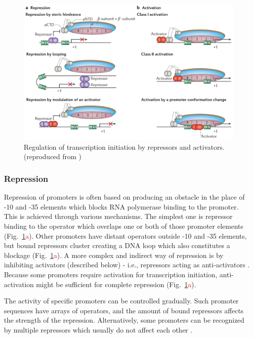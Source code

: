 \begin{figure}[ht!]
  \centering
  \includegraphics[scale=0.4]{text/Pictures/TxnInitRegulation.png}
    \caption{Regulation of transcription initiation by repressors and activators. (reproduced from \cite{browning2016local})}
    \label{txn}
\end{figure}

\subsubsection{Repression}
Repression of promoters is often based on producing an obstacle in the place of -10 and -35 elements which blocks RNA polymerase binding to the promoter.
This is achieved through various mechanisms.
The simplest one is repressor binding to the operator which overlaps one or both of those promoter elements \cite{brent1981mechanism} (Fig.~\ref{txn}\textcolor{red}{a}).
Other promoters have distant operators outside -10 and -35 elements, but bound repressors cluster creating a DNA loop which also constitutes a blockage \cite{semsey2004dna} (Fig.~\ref{txn}\textcolor{red}{a}).
A more complex and indirect way of repression is by inhibiting activators (described below) - i.e., repressors acting as anti-activators \cite{sogaard1993protein}.
Because some promoters require activation for transcription initiation, anti-activation might be sufficient for complete repression (Fig.~\ref{txn}\textcolor{red}{a}).

The activity of specific promoters can be controlled gradually.
Such promoter sequences have arrays of operators, and the amount of bound repressors affects the strength of the repression.
Alternatively, some promoters can be recognized by multiple repressors which usually do not affect each other \cite{el2009repression}.

